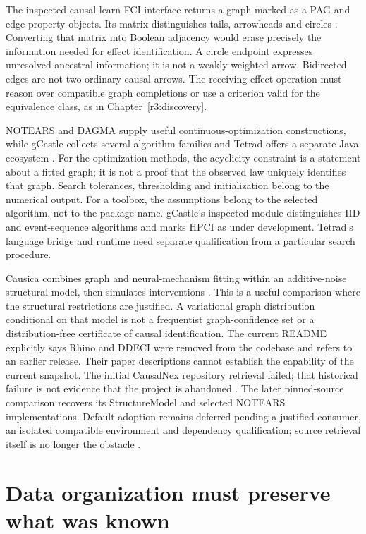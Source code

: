 The inspected causal-learn FCI interface returns a graph marked as a PAG
and edge-property objects. Its matrix distinguishes tails, arrowheads
and circles \citep{sw_causallearn}. Converting that matrix into Boolean
adjacency would erase precisely the information needed for
effect identification. A circle endpoint expresses unresolved ancestral
information; it is not a weakly weighted arrow. Bidirected edges are not
two ordinary causal arrows. The receiving effect operation must reason
over compatible graph completions or use a criterion valid for the
equivalence class, as in Chapter~\ref{r3:discovery}.

NOTEARS and DAGMA supply useful continuous-optimization constructions,
while gCastle collects several algorithm families and Tetrad offers a
separate Java ecosystem \citep{sw_notears,sw_dagma,sw_gcastle,sw_tetrad}.
For the optimization methods, the acyclicity constraint is a statement
about a fitted graph; it is not a proof that the observed law uniquely
identifies that graph. Search tolerances, thresholding and initialization
belong to the numerical output. For a toolbox, the assumptions belong to
the selected algorithm, not to the package name. gCastle's inspected
module distinguishes IID and event-sequence algorithms and marks HPCI
as under development. Tetrad's language bridge and runtime need separate
qualification from a particular search procedure.

Causica combines graph and neural-mechanism fitting within an additive-noise
structural model, then simulates interventions \citep{sw_causica}.
This is a useful comparison where the structural restrictions are justified.
A variational graph distribution conditional on that model is not a
frequentist graph-confidence set or a distribution-free certificate of
causal identification. The current README explicitly says Rhino and
DDECI were removed from the codebase and refers to an earlier release.
Their paper descriptions cannot establish the capability of the current
snapshot. The initial CausalNex repository retrieval failed; that historical
failure is not evidence that the project is abandoned \citep{sw_causalnex}.
The later pinned-source comparison recovers its StructureModel and selected
NOTEARS implementations. Default adoption remains deferred pending a justified
consumer, an isolated compatible environment and dependency qualification;
source retrieval itself is no longer the obstacle
\citep{exec13_pydisc_causalnex}.

\section{Data organization must preserve what was known}
\label{r3:software-data}


